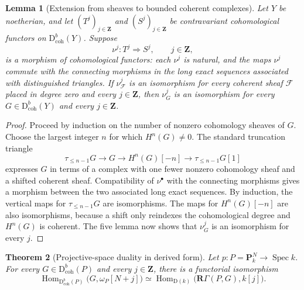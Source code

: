 \documentclass[11pt,a4paper]{article}
\newtheorem{theorem}{Theorem}[section]
\newtheorem{lemma}[theorem]{Lemma}
\theoremstyle{definition}
\theoremstyle{remark}
\newcommand{\PP}{\mathbf P}
\newcommand{\Spec}{\operatorname{Spec}}
\newcommand{\Hom}{\operatorname{Hom}}
\newcommand{\RGamma}{\mathbf R\Gamma}
\newcommand{\D}{\mathrm D}
\newcommand{\Dbcoh}{\mathrm D^b_{\mathrm{coh}}}
\begin{document}
\begin{lemma}[Extension from sheaves to bounded coherent complexes]
\label{lem:devissage}
Let $Y$ be noetherian, and let $(T^j)_{j\in\mathbf Z}$ and
$(S^j)_{j\in\mathbf Z}$ be contravariant cohomological functors on
$\Dbcoh(Y)$. Suppose
\[
  \nu^j:T^j\Longrightarrow S^j,
  \qquad j\in\mathbf Z,
\]
is a morphism of cohomological functors: each $\nu^j$ is natural, and the
maps $\nu^j$ commute with the connecting morphisms in the long exact
sequences associated with distinguished triangles. If
$\nu^j_{\mathcal F}$ is an isomorphism for every coherent sheaf
$\mathcal F$ placed in degree zero and every $j\in\mathbf Z$, then
$\nu^j_G$ is an isomorphism for every $G\in\Dbcoh(Y)$ and every
$j\in\mathbf Z$.
\end{lemma}

\begin{proof}
Proceed by induction on the number of nonzero cohomology sheaves of $G$.
Choose the largest integer $n$ for which $H^n(G)\neq0$. The standard
truncation triangle
\[
  \tau_{\leq n-1}G\longrightarrow G\longrightarrow H^n(G)[-n]
  \longrightarrow\tau_{\leq n-1}G[1]
\]
expresses $G$ in terms of a complex with one fewer nonzero cohomology sheaf
and a shifted coherent sheaf. Compatibility of $\nu^\bullet$ with the
connecting morphisms gives a morphism between the two associated long exact
sequences. By induction, the vertical maps for $\tau_{\leq n-1}G$ are
isomorphisms. The maps for $H^n(G)[-n]$ are also isomorphisms, because a
shift only reindexes the cohomological degree and $H^n(G)$ is coherent. The
five lemma now shows that $\nu^j_G$ is an isomorphism for every $j$.
\end{proof}

\begin{theorem}[Projective-space duality in derived form]
\label{thm:projective-derived}
Let $p:P=\PP^N_k\to\Spec k$. For every $G\in\Dbcoh(P)$ and every
$j\in\mathbf Z$, there is a functorial isomorphism
\begin{equation}\label{eq:projective-derived}
  \Hom_{\Dbcoh(P)}\bigl(G,\omega_P[N+j]\bigr)
  \simeq
  \Hom_{\D(k)}\bigl(\RGamma(P,G),k[j]\bigr).
\end{equation}
\end{theorem}
\end{document}
